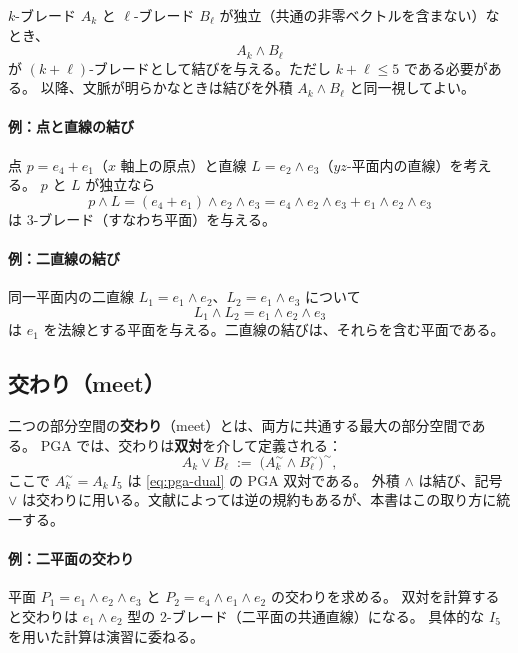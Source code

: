 \documentclass[dvipdfmx,a4paper,oneside]{jsbook}
\numberwithin{equation}{chapter}
\begin{document}
\(k\)-ブレード \(A_k\) と \(\ell\)-ブレード \(B_\ell\) が独立（共通の非零ベクトルを含まない）なとき、
\begin{equation}
  A_k \wedge B_\ell
  \label{eq:join-def}
\end{equation}
が \((k+\ell)\)-ブレードとして結びを与える。ただし \(k+\ell \leq 5\) である必要がある。
以降、文脈が明らかなときは結びを外積 \(A_k \wedge B_\ell\) と同一視してよい。

\paragraph{例：点と直線の結び}
点 \(p = e_4 + e_1\)（\(x\) 軸上の原点）と直線 \(L = e_2 \wedge e_3\)（\(yz\)-平面内の直線）を考える。
\(p\) と \(L\) が独立なら
\[
  p \wedge L = (e_4 + e_1) \wedge e_2 \wedge e_3
  = e_4 \wedge e_2 \wedge e_3 + e_1 \wedge e_2 \wedge e_3
\]
は 3-ブレード（すなわち平面）を与える。

\paragraph{例：二直線の結び}
同一平面内の二直線 \(L_1 = e_1 \wedge e_2\)、\(L_2 = e_1 \wedge e_3\) について
\[
  L_1 \wedge L_2 = e_1 \wedge e_2 \wedge e_3
\]
は \(e_1\) を法線とする平面を与える。二直線の結びは、それらを含む平面である。

\subsection{交わり（meet）}

二つの部分空間の\textbf{交わり}（meet）とは、両方に共通する最大の部分空間である。
PGA では、交わりは\textbf{双対}を介して定義される：
\begin{equation}
  A_k \vee B_\ell \;:=\; \bigl( A_k^{\sim} \wedge B_\ell^{\sim} \bigr)^{\sim},
  \label{eq:meet-def}
\end{equation}
ここで \(A_k^{\sim} = A_k\, I_5\) は \eqref{eq:pga-dual} の PGA 双対である。
外積 \(\wedge\) は結び、記号 \(\vee\) は交わりに用いる。文献によっては逆の規約もあるが、本書はこの取り方に統一する。

\paragraph{例：二平面の交わり}
平面 \(P_1 = e_1 \wedge e_2 \wedge e_3\) と \(P_2 = e_4 \wedge e_1 \wedge e_2\) の交わりを求める。
双対を計算すると交わりは \(e_1 \wedge e_2\) 型の 2-ブレード（二平面の共通直線）になる。
具体的な \(I_5\) を用いた計算は演習に委ねる。
\end{document}

